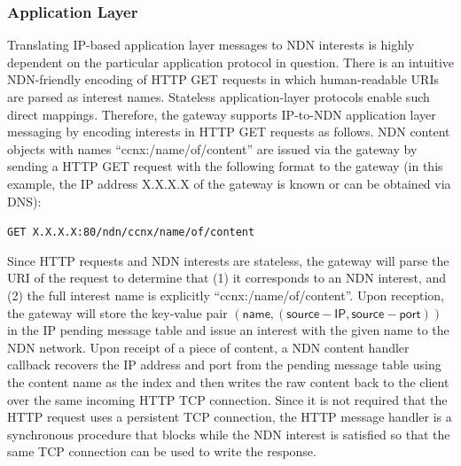 \subsubsection{Application Layer}
Translating IP-based application layer messages to NDN interests is highly dependent on the particular application protocol in question. There is an intuitive NDN-friendly encoding of HTTP GET requests in which human-readable URIs are parsed as interest names. Stateless application-layer protocols enable such direct mappings. Therefore, the gateway supports IP-to-NDN application layer messaging by encoding interests in HTTP GET requests as follows. NDN content objects with names ``ccnx:/name/of/content'' are issued via the gateway by sending a HTTP GET request with the following format to the gateway (in this example, the IP address X.X.X.X of the gateway is known or can be obtained via DNS):
\begin{center}
{\tt GET X.X.X.X:80/ndn/ccnx/name/of/content}
\end{center}
Since HTTP requests and NDN interests are stateless, the gateway will parse the URI of the request to determine that (1) it corresponds to an NDN interest, and (2) the full interest name is explicitly ``ccnx:/name/of/content''. Upon reception, the gateway will store the key-value pair $(\mathsf{name}, (\mathsf{source-IP}, \mathsf{source-port}))$ in the IP pending message table and issue an interest with the given name to the NDN network. Upon receipt of a piece of content, a NDN content handler callback recovers the IP address and port from the pending message table using the content name as the index and then writes the raw content back to the client over the same incoming HTTP TCP connection. Since it is not required that the HTTP request uses a persistent TCP connection, the HTTP message handler is a synchronous procedure that blocks while the NDN interest is satisfied so that the same TCP connection can be used to write the response. 

